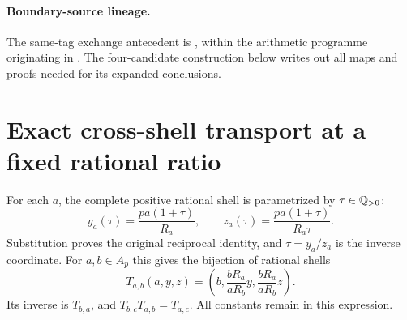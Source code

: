 \documentclass[11pt]{article}
\theoremstyle{definition}\newtheorem{definition}[theorem]{Definition}
\theoremstyle{remark}\newtheorem{remark}[theorem]{Remark}
\begin{document}
\paragraph{Boundary-source lineage.}
The same-tag exchange antecedent is \cite{SignedMarginAntecedent}, within
the arithmetic programme originating in \cite{UmbrellaContribution}.
The four-candidate construction below writes out all maps and proofs needed
for its expanded conclusions.


\section{Exact cross-shell transport at a fixed rational ratio}

For each \(a\), the complete positive rational shell is parametrized
by \(\tau\in\mathbb Q_{>0}\):
\[
 y_a(\tau)=\frac{pa(1+\tau)}{R_a},\qquad
 z_a(\tau)=\frac{pa(1+\tau)}{R_a\tau}.
\]
Substitution proves the original reciprocal identity, and
\(\tau=y_a/z_a\) is the inverse coordinate.  For \(a,b\in A_p\)
this gives the bijection of rational shells
\begin{equation}\label{eq:rational-transport}
 T_{a,b}(a,y,z)=
 \left(b,\frac{bR_a}{aR_b}y,\frac{bR_a}{aR_b}z\right).
\end{equation}
Its inverse is \(T_{b,a}\), and \(T_{b,c}T_{a,b}=T_{a,c}\).
All constants remain in this expression.
\end{document}
